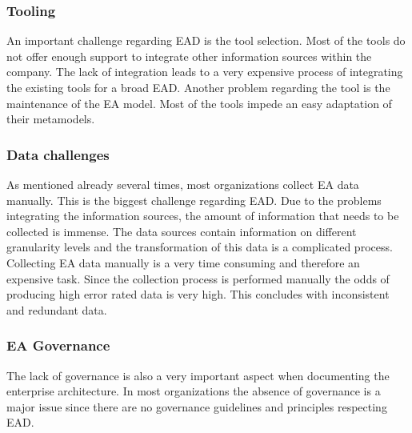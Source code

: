 \subsubsection{Tooling}
An important challenge regarding EAD is the tool selection. Most of the tools do not offer enough support to integrate other information sources within the company. The lack of integration leads to a very expensive process of integrating the existing tools for a broad EAD.
Another problem regarding the tool is the maintenance of the EA model. Most of the tools impede an easy adaptation of their metamodels.

\subsubsection{Data challenges}
As mentioned already several times, most organizations collect EA data manually. This is the biggest challenge regarding EAD. Due to the problems integrating the information sources, the amount of information that needs to be collected is immense. The data sources contain information on different granularity levels and the transformation of this data is a complicated process.
Collecting EA data manually is a very time consuming and therefore an expensive task. Since the collection process is performed manually the odds of producing high error rated data is very high. This concludes with inconsistent and redundant data. \cite{Buschle2012}

\subsubsection{EA Governance}
The lack of governance is also a very important aspect when documenting the enterprise architecture. In most organizations the absence of governance is a major issue since there are no governance guidelines and principles respecting EAD.




